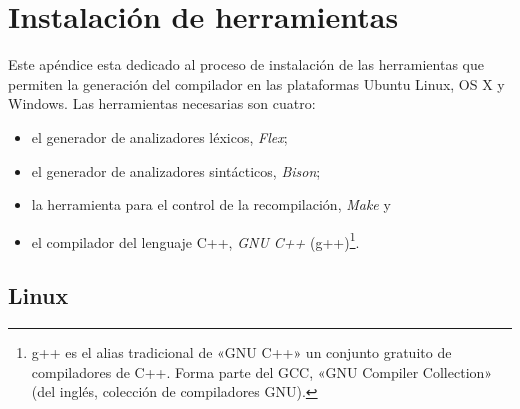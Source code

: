 \chapter{Instalación de herramientas}

Este apéndice esta dedicado al proceso de instalación de las herramientas que permiten la generación del compilador \Set en las plataformas Ubuntu Linux, OS X y Windows. Las herramientas necesarias son cuatro:
\begin{itemize}
	\item el generador de analizadores léxicos, \emph{Flex}; 
	
	\item el generador de analizadores sintácticos, \emph{Bison};

	\item la herramienta para el control de la recompilación, \emph{Make} y 

	\item el compilador del lenguaje C++, \emph{GNU C++} (g++)\footnote
	{
		g++ es el alias tradicional de «GNU C++» un conjunto gratuito de compiladores de C++. Forma parte del GCC, «GNU Compiler Collection» (del inglés, colección de compiladores GNU).
	}.
\end{itemize}

\section{Linux}

